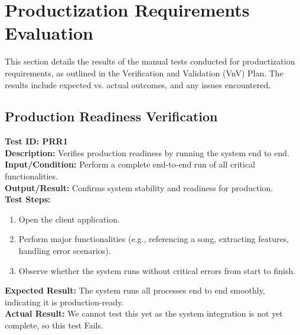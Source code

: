 \documentclass[12pt, titlepage]{article}
\begin{document}
\section{Productization Requirements Evaluation}
This section details the results of the manual tests conducted for productization
requirements, as outlined in the Verification and Validation (VnV) Plan. The
results include expected vs. actual outcomes, and any issues encountered.

\subsection{Production Readiness Verification}
\textbf{Test ID: PRR1}\\
\textbf{Description:} Verifies production readiness by running the system end to end.\\
\textbf{Input/Condition:} Perform a complete end-to-end run of all critical functionalities.\\
\textbf{Output/Result:} Confirms system stability and readiness for production.\\
\textbf{Test Steps:}
\begin{enumerate}
    \item Open the client application.
    \item Perform major functionalities (e.g., referencing a song, extracting features, handling error scenarios).
    \item Observe whether the system runs without critical errors from start to finish.
\end{enumerate}
\textbf{Expected Result:} The system runs all processes end to end smoothly, indicating it is production-ready.\\
\textbf{Actual Result:} We cannot test this yet as the system integration is not yet complete, so this test Fails.
\end{document}
